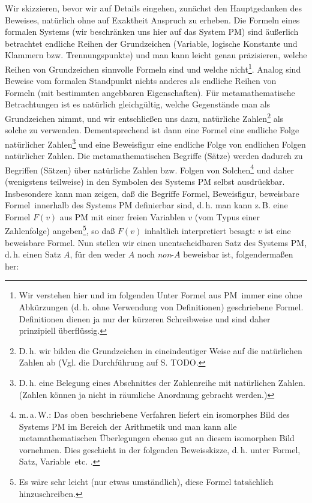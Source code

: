 \documentclass{scrartcl}
\begin{document}
Wir skizzieren, bevor wir auf Details eingehen, zunächst
den Hauptgedanken des Beweises, natürlich ohne auf 
Exaktheit Anspruch zu erheben. Die Formeln eines formalen Systems (wir beschränken uns hier auf das System PM) sind
äußerlich betrachtet endliche Reihen der Grundzeichen
(Variable, logische Konstante und Klammern bzw.
Trennungspunkte) und man kann leicht genau präzisieren,
welche Reihen von Grundzeichen sinnvolle Formeln sind
und welche nicht\footnote{Wir verstehen hier und im folgenden
Unter \glqq Formel aus PM\grqq\ immer eine ohne Abkürzungen 
(d.\,h. ohne Verwendung von Definitionen)
geschriebene Formel. Definitionen dienen ja nur der kürzeren
Schreibweise und sind daher prinzipiell überflüssig.}.
Analog sind Beweise vom formalen Standpunkt nichts anderes
als endliche Reihen von Formeln (mit bestimmten angebbaren
Eigenschaften). Für metamathematische Betrachtungen
ist es natürlich gleichgültig, welche Gegenstände man
als Grundzeichen nimmt, und wir entschließen uns dazu,
natürliche Zahlen\footnote{D.\,h. wir bilden die Grundzeichen 
in eineindeutiger Weise auf die natürlichen Zahlen ab (Vgl. die Durchführung auf S. TODO.}
als solche zu verwenden. Dementsprechend ist dann eine
Formel eine endliche Folge natürlicher 
Zahlen\footnote{D.\,h. eine Belegung eines Abschnittes der 
Zahlenreihe mit natürlichen Zahlen. (Zahlen können ja nicht in
räumliche Anordnung gebracht werden.)} und eine Beweisfigur eine
endliche Folge von endlichen Folgen natürlicher Zahlen.
Die metamathematischen Begriffe (Sätze) werden dadurch zu
Begriffen (Sätzen) über natürliche Zahlen bzw. Folgen von
Solchen\footnote{m.\,a.\,W.: Das oben beschriebene Verfahren 
liefert ein isomorphes Bild des Systems PM im Bereich der
Arithmetik und man kann alle metamathematischen Überlegungen
ebenso gut an diesem isomorphen Bild vornehmen. Dies geschieht 
in der folgenden Beweisskizze, d.\,h. unter \glqq Formel\grqq, 
\glqq Satz\grqq, \glqq Variable\grqq\ etc. 
.}
und daher (wenigstens teilweise) in den Symbolen
des Systems PM selbst ausdrückbar. Insbesondere kann man
zeigen, daß die Begriffe \glqq Formel\grqq, 
\glqq Beweisfigur\grqq, 
\glqq beweisbare Formel\grqq\ innerhalb des Systems PM 
definierbar sind, d.\,h. man kann z.\,B. eine Formel 
$F(v)$ aus PM mit einer freien Variablen $v$ (vom Typus 
einer Zahlenfolge) angeben\footnote{Es wäre sehr leicht 
(nur etwas umständlich), diese Formel tatsächlich hinzuschreiben.},
so daß $F(v)$ inhaltlich interpretiert besagt:
$v$ ist eine beweisbare Formel. Nun stellen wir einen
unentscheidbaren Satz des Systems PM, d.\,h. einen
Satz $A$, für den weder $A$ noch \textit{non}-$A$ beweisbar
ist, folgendermaßen her:
\end{document}
